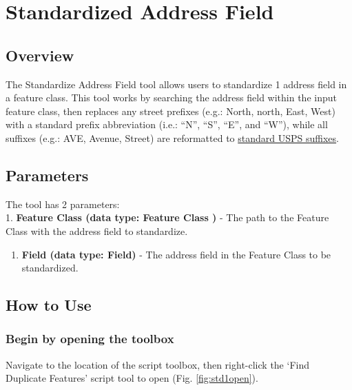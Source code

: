 \documentclass[openany]{book}
\providecommand{\tightlist}{%
  \setlength{\itemsep}{0pt}\setlength{\parskip}{0pt}}
\theoremstyle{definition}
\theoremstyle{definition}
\theoremstyle{definition}
\theoremstyle{remark}
\begin{document}
\hypertarget{stdAdd1}{\chapter{Standardized Address
Field}\label{stdAdd1}}

\section{Overview}\label{overview-6}

The Standardize Address Field tool allows users to standardize 1 address
field in a feature class. This tool works by searching the address field
within the input feature class, then replaces any street prefixes (e.g.:
North, north, East, West) with a standard prefix abbreviation (i.e.:
``N'', ``S'', ``E'', and ``W''), while all suffixes (e.g.: AVE, Avenue,
Street) are reformatted to
\href{https://github.com/allanbreyes/udacity-data-science/blob/master/p2/data/suffixes.csv}{standard
USPS suffixes}.

\section{Parameters}\label{parameters-6}

The tool has 2 parameters:\\
1. \textbf{Feature Class (data type: Feature Class )} - The path to the
Feature Class with the address field to standardize.

\begin{enumerate}
\def\labelenumi{\arabic{enumi}.}
\setcounter{enumi}{1}
\tightlist
\item
  \textbf{Field (data type: Field)} - The address field in the Feature
  Class to be standardized.
\end{enumerate}

\section{How to Use}\label{how-to-use-6}

\subsection{Begin by opening the
toolbox}\label{begin-by-opening-the-toolbox-6}

Navigate to the location of the script toolbox, then right-click the
`Find Duplicate Features' script tool to open (Fig. \ref{fig:std1open}).
\end{document}
